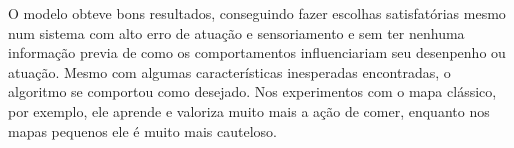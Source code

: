 O modelo obteve bons resultados, conseguindo fazer escolhas satisfatórias mesmo num sistema com alto erro de atuação e sensoriamento e sem ter nenhuma informação previa de como os comportamentos influenciariam seu desenpenho ou atuação. Mesmo com algumas características inesperadas encontradas, o algoritmo se comportou como desejado. Nos experimentos com o mapa clássico, por exemplo, ele aprende e valoriza muito mais a ação de comer, enquanto nos mapas pequenos ele é muito mais cauteloso.
